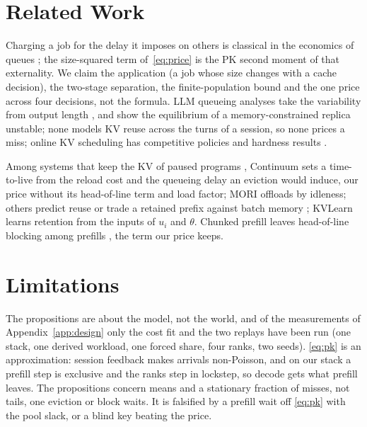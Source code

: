 \documentclass{article}
\theoremstyle{plain}
\theoremstyle{definition}
\theoremstyle{remark}
\begin{document}
\section{Related Work}\label{sec:related}

Charging a job for the delay it imposes on others is classical in the
economics of queues \citep{naor1969,mendelson1990}; the size-squared
term of~\eqref{eq:price} is the PK second moment of that externality.
We claim the application (a job whose size changes with a cache
decision), the two-stage separation, the finite-population bound and
the one price across four decisions, not the formula. LLM queueing
analyses take the variability from output length
\citep{mitzenmacher2025queueing,yang2024mg1,ozbas2026reasoning,shahout2024trail},
and \citet{ao2026congestion} show the equilibrium of a
memory-constrained replica unstable; none models KV reuse across the turns of a session, so
none prices a miss; online KV scheduling has competitive policies and
hardness results
\citep{jaillet2025online,feng2026nonclairvoyant,wang2025variable,dexter2025prefix}.

Among systems that keep the KV of paused programs
\citep{thunderagent,infercept}, Continuum \citep{li2025continuum} sets
a time-to-live from the reload cost and the queueing delay an eviction
would induce, our price without its head-of-line term and load factor;
MORI \citep{xia2026mori} offloads by idleness; others predict reuse or
trade a retained prefix against batch memory
\citep{bian2025tokencake,pan2025kvflow,zhang2026cachescout,ni2026topas};
KVLearn \citep{kvlearn2026} learns retention from the inputs of $u_i$
and $\theta$. Chunked prefill \citep{sarathi2024} leaves
head-of-line blocking among prefills
\citep{hsieh2026flowprefill,liu2026chunkedfair,lyu2025fairbatching},
the term our price keeps.

\section{Limitations}\label{sec:limits}

The propositions are about the model, not the world, and of the
measurements of Appendix~\ref{app:design} only the cost fit and the
two replays have been run
(one stack, one derived workload, one forced share, four ranks, two
seeds). \eqref{eq:pk} is an approximation: session
feedback makes arrivals non-Poisson, and on our stack a prefill step is
exclusive and the ranks step in lockstep, so decode gets what prefill
leaves. The propositions concern means and a stationary fraction of
misses, not tails, one eviction or block waits.
It is falsified by a prefill wait off \eqref{eq:pk} with the pool
slack, or a blind key beating the price.
\end{document}
